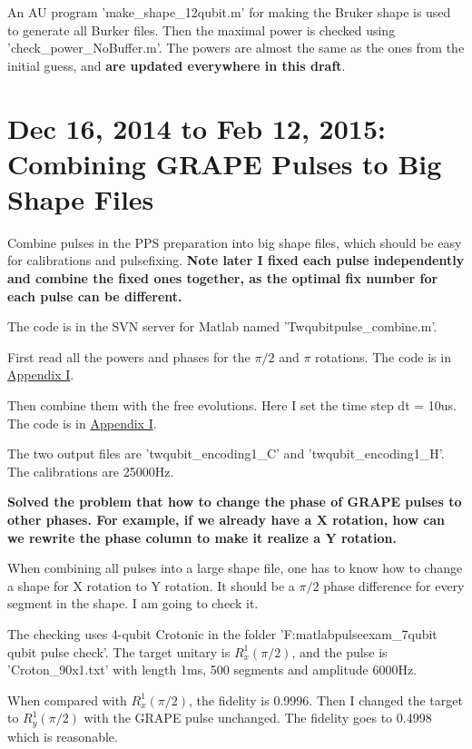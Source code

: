 An AU program 'make\_shape\_12qubit.m' for making the Bruker shape is used to generate all Burker files. Then the maximal power is checked using 'check\_power\_NoBuffer.m'. The powers are almost the same as the ones from the initial guess, and \textbf{are updated everywhere in this draft}.

\clearpage
\section{Dec 16, 2014 to Feb 12, 2015: Combining GRAPE Pulses to Big Shape Files}

{}

Combine pulses in the PPS preparation into big shape files, which should be easy for calibrations and pulsefixing. \textbf{Note later I fixed each pulse independently and combine the fixed ones together, as the optimal fix number for each pulse can be different.}

The code is in the SVN server for Matlab named '\dir Twqubit\dir pulse\_combine.m'.

First read all the powers and phases for the $\pi/2$ and $\pi$ rotations. The code is in \hyperlink{code:read_power_phase}{Appendix I}.

Then combine them with the free evolutions. Here I set the time step dt = 10us. The code is in \hyperlink{code:combine_encoding1}{Appendix I}.

The two output files are 'twqubit\_encoding1\_C' and 'twqubit\_encoding1\_H'. The calibrations are 25000Hz.

{}

\textbf{Solved the problem that how to change the phase of GRAPE pulses to other phases. For example, if we already have a X rotation, how can we rewrite the phase column to make it realize a Y rotation.}

When combining all pulses into a large shape file, one has to know how to change a shape for X rotation to Y rotation. It should be a $\pi/2$ phase difference for every segment in the shape. I am going to check it.

The checking uses 4-qubit Crotonic in the folder 'F:\dir matlab\dir pulseexam\_7qubit qubit pulse check'. The target unitary is $R_x^1(\pi/2)$, and the pulse is 'Croton\_90x1.txt' with length 1ms, 500 segments and amplitude 6000Hz.

When compared with $R_x^1(\pi/2)$, the fidelity is 0.9996. Then I changed the target to $R_y^1(\pi/2)$ with the GRAPE pulse unchanged. The fidelity goes to 0.4998 which is reasonable.


